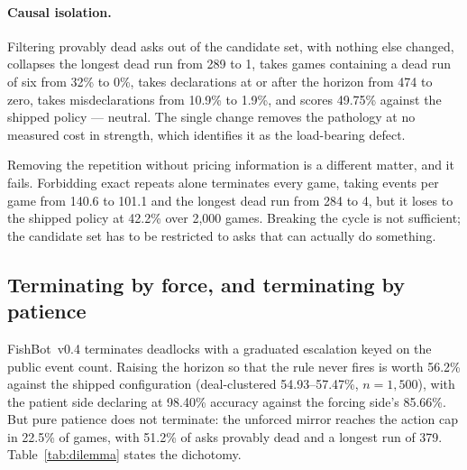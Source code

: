 \documentclass[11pt]{article}
\theoremstyle{definition}
\DeclareRobustCommand{\vfour}{\texorpdfstring{\mbox{FishBot v0.4}}{FishBot v0.4}}
\providecommand{\numPatientWin}{56.2}
\providecommand{\numPatientWinCI}{54.93--57.47}
\providecommand{\numPatientDeclAcc}{98.40}
\providecommand{\numForcingDeclAcc}{85.66}
\providecommand{\numPatientCap}{22.5}
\providecommand{\numPatientDeadAsk}{51.2}
\providecommand{\numPatientDeadRun}{379}
\providecommand{\numPatientN}{1{,}500}
\providecommand{\numNoRepeatWin}{42.2}
\providecommand{\numNoRepeatBaseEvents}{140.6}
\providecommand{\numNoRepeatEvents}{101.1}
\providecommand{\numNoRepeatBaseRun}{284}
\providecommand{\numNoRepeatRun}{4}
\providecommand{\numNoRepeatGames}{2{,}000}
\providecommand{\numFilterBaseDeadRun}{289}
\providecommand{\numFilterBaseGames}{32}
\providecommand{\numFilterBaseDeclWrong}{10.9}
\providecommand{\numFilterDeadRun}{1}
\providecommand{\numFilterDeclWrong}{1.9}
\providecommand{\numFilterWin}{49.75}
\providecommand{\numFilterBasePostHorizon}{474}
\begin{document}
\paragraph{Causal isolation.} Filtering provably dead asks out of the candidate
set, with nothing else changed, collapses the longest dead run from
\numFilterBaseDeadRun{} to \numFilterDeadRun{}, takes games containing a dead run
of six from \numFilterBaseGames\% to 0\%, takes declarations at or after the
horizon from \numFilterBasePostHorizon{} to zero, takes misdeclarations from \numFilterBaseDeclWrong\% to
\numFilterDeclWrong\%, and scores \numFilterWin\% against the shipped policy ---
neutral. The single change removes the pathology at no measured cost in strength,
which identifies it as the load-bearing defect.

Removing the repetition without pricing information is a different matter, and it
fails. Forbidding exact repeats alone terminates every game, taking events per
game from \numNoRepeatBaseEvents{} to \numNoRepeatEvents{} and the longest dead
run from \numNoRepeatBaseRun{} to \numNoRepeatRun{}, but it loses to the shipped
policy at \numNoRepeatWin\% over \numNoRepeatGames{} games. Breaking the cycle is
not sufficient; the candidate set has to be restricted to asks that can actually
do something.

\subsection{Terminating by force, and terminating by patience}
\label{sec:diag-dilemma}

\vfour{} terminates deadlocks with a graduated escalation keyed on the public
event count. Raising the horizon so that the rule never fires is worth
\numPatientWin\% against the shipped configuration (deal-clustered
\numPatientWinCI\%, $n = \numPatientN$), with the patient side declaring at
\numPatientDeclAcc\% accuracy against the forcing side's \numForcingDeclAcc\%.
But pure patience does not terminate: the unforced mirror reaches the action cap
in \numPatientCap\% of games, with \numPatientDeadAsk\% of asks provably dead and
a longest run of \numPatientDeadRun{}. Table~\ref{tab:dilemma} states the
dichotomy.
\end{document}
